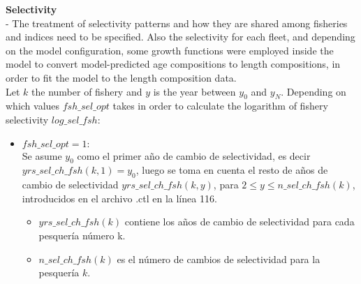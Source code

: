 \documentclass{article}
\begin{document}
\textbf{Selectivity}\\
- The treatment of selectivity patterns and how they are shared among fisheries and indices need to be specified. Also the selectivity for each fleet, and depending on the model configuration, some growth functions were employed inside the model to convert model-predicted age compositions to length compositions, in order to fit the model to the length composition data.\\

Let $k$ the number of fishery and $y$ is the year between $y_0$ and $y_N$.
Depending on which values $fsh\_sel\_opt$ takes in order to calculate the logarithm of fishery selectivity $log\_sel\_fsh$:
\begin{itemize}
\item $fsh\_sel\_opt=1:$\\
Se asume $y_0$ como el primer año de cambio de selectividad, es decir $yrs\_sel\_ch\_fsh(k,1)=y_0$, luego se toma en cuenta el resto de años de cambio de selectividad $yrs\_sel\_ch\_fsh(k,y)$, para $2\leq y \leq n\_sel\_ch\_fsh(k)$, introducidos en el archivo .ctl en la línea 116.
\begin{itemize}
    \item $yrs\_sel\_ch\_fsh(k)$ contiene los años de cambio de selectividad para cada pesquería número k.
    \item $n\_sel\_ch\_fsh(k)$ es el número de cambios de selectividad para la pesquería $k$.
    
\end{itemize}



\end{itemize}
\end{document}
